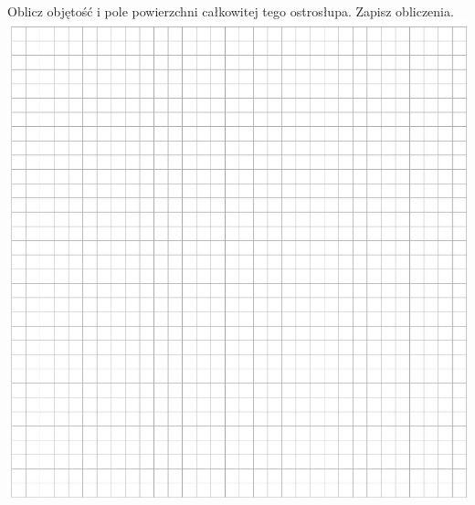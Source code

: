 \documentclass[10pt]{article}
\begin{document}
Oblicz objętość i pole powierzchni całkowitej tego ostrosłupa. Zapisz obliczenia.\\
\includegraphics[max width=\textwidth, center]{2024_11_21_51cb67544fb9b029f01cg-22(1)}\\
\end{document}
